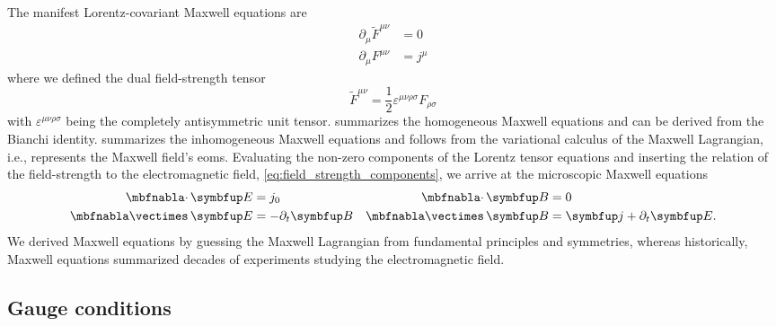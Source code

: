 The manifest Lorentz-covariant Maxwell equations are~\cite[p.~336]{Srednicki2007}
\begin{align}
	\partial_\mu
	\tilde{F}^{\mu\nu}
	&=
	0
	\label{eq:covariant_homogeneous_maxwell_equations}
	\\
	\partial_\mu
	F^{\mu\nu}
	&=
	j^\mu
	\label{eq:covariant_inhomogeneous_maxwell_equations}
\end{align}
where we defined the dual field-strength tensor~\cite[p.~142]{Greiner2013}
\begin{equation}
	\tilde{F}^{\mu\nu}
	=
	\frac{1}{2}
	\varepsilon^{\mu\nu\rho\sigma}
	F_{\rho\sigma}
	\label{eq:dual_field_strength}
\end{equation}
with $\varepsilon^{\mu\nu\rho\sigma}$ being the completely antisymmetric unit tensor.
 summarizes the homogeneous Maxwell equations and can be derived from the Bianchi identity.
 summarizes the inhomogeneous Maxwell equations and follows from the variational calculus of the Maxwell Lagrangian, i.e., represents the Maxwell field's \gls{eom}s.
Evaluating the non-zero components of the Lorentz tensor equations and inserting the relation of the field-strength to the electromagnetic field, \cref{eq:field_strength_components}, we arrive at the microscopic Maxwell equations
\begin{align}
	\div\vb{E}
	&=
	j_0
	&
	\div\vb{B}
	&=
	0
	\\
	\curl\vb{E}
	&=
	-\partial_t\vb{B}
	&
	\curl\vb{B}
	&=
	\vb{j}
	+
	\partial_t\vb{E}
	.
\end{align}
We derived Maxwell equations by guessing the Maxwell Lagrangian from fundamental principles and symmetries, whereas historically, Maxwell equations summarized decades of experiments studying the electromagnetic field.

\subsection{Gauge conditions}

